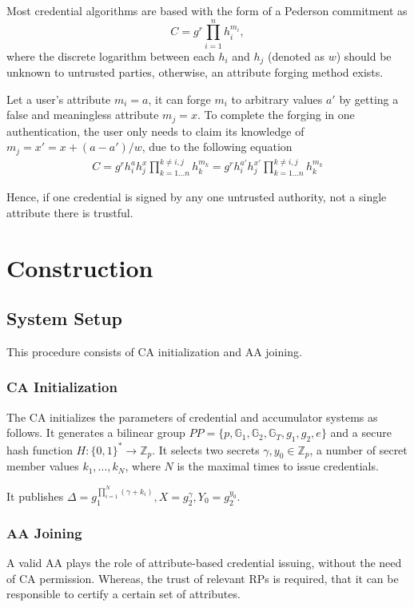 \documentclass[journal]{IEEEtran}
\begin{document}
Most credential algorithms are based with the form of a Pederson commitment as 
$$C = g^r\prod_{i=1}^n h_i^{m_i},$$
where the discrete logarithm between each $h_i$ and $h_j$ (denoted as $w$) should be unknown to untrusted parties, otherwise, an attribute forging method exists. 

Let a user's attribute $m_i = a$, it can forge $m_i$ to arbitrary values $a'$ by getting a false and meaningless attribute $m_j =x$. To complete the forging in one authentication, the user only needs to claim its knowledge of $m_j = x' = x + (a-a')/w$, due to the following equation
\begin{align}
	C = g^r h_i^a h_j^x\prod_{k=1\dots n}^{k\neq i,j} h_k^{m_k} = g^r h_i^{a'} h_j^{x'}\prod_{k=1\dots n}^{k\neq i,j} h_k^{m_k}
\end{align}

Hence, if one credential is signed by any one untrusted authority, not a single attribute there is trustful.
\section{Construction}	
	\subsection{System Setup}
	This procedure consists of CA initialization and AA joining. 
	\subsubsection{CA Initialization}
	The CA initializes the parameters of credential and accumulator systems as follows. It generates a bilinear group $PP=\{p, \mathbb{G}_1, \mathbb{G}_2, \mathbb{G}_T, g_1, g_2, e\}$ and a secure hash function $H:\{0,1\}^*\rightarrow \mathbb{Z}_p$. It selects two secrets $\gamma, y_0\in \mathbb{Z}_p$, a number of secret member values $k_1, \dots, k_N$, where $N$ is the maximal times to issue credentials.
	
	It publishes $\Delta = g_1^{\prod_{i=1}^{N}(\gamma+k_i)}, X= g_2^\gamma, Y_0= g_2^{y_0}$.
	\subsubsection{AA Joining}
	A valid AA plays the role of attribute-based credential issuing, without the need of CA permission. Whereas, the trust of relevant RPs is required, that it can be responsible to certify a certain set of attributes.
	
\end{document}
